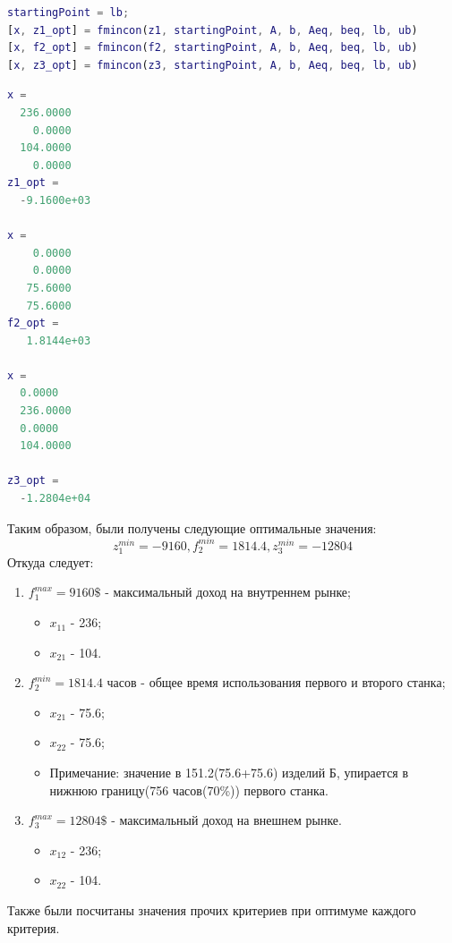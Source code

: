 \begin{lstlisting}[language={matlab}, caption={Поиск оптимумов частных критериев}, label={lst:1}]
%% Поиск оптимумов частных критериев
startingPoint = lb;
[x, z1_opt] = fmincon(z1, startingPoint, A, b, Aeq, beq, lb, ub)
[x, f2_opt] = fmincon(f2, startingPoint, A, b, Aeq, beq, lb, ub)
[x, z3_opt] = fmincon(z3, startingPoint, A, b, Aeq, beq, lb, ub)
\end{lstlisting}

\begin{lstlisting}[language={matlab}, caption={Результаты выполнения листинга \ref{lst:1}}]
x =
  236.0000
    0.0000
  104.0000
    0.0000
z1_opt =
  -9.1600e+03

x =
    0.0000
    0.0000
   75.6000
   75.6000
f2_opt =
   1.8144e+03

x =
  0.0000
  236.0000
  0.0000
  104.0000

z3_opt =
  -1.2804e+04

\end{lstlisting}
Таким образом, были получены следующие оптимальные значения:
\begin{equation}
z_1^{min}=-9160, f_2^{min}=1814.4, z_3^{min}=-12804
\end{equation}
Откуда следует:
\begin{enumerate}
\item $f_1^{max} = 9160\$$ - максимальный доход на внутреннем рынке;
\begin{itemize}
\item $x_{11}$ - 236;
\item $x_{21}$ - 104.
\end{itemize}
\item $f_2^{min}=1814.4$ часов - общее время использования первого и второго станка;
\begin{itemize}
\item $x_{21}$ - 75.6;
\item $x_{22}$ - 75.6;
\item Примечание: значение в 151.2(75.6+75.6) изделий Б, упирается в нижнюю границу(756 часов(70\%)) первого станка.
\end{itemize}
\item $f_3^{max}=12804\$$ - максимальный доход на внешнем рынке.
\begin{itemize}
\item $x_{12}$ - 236;
\item $x_{22}$ - 104.
\end{itemize}
\end{enumerate}
Также были посчитаны значения прочих критериев при оптимуме каждого критерия.

